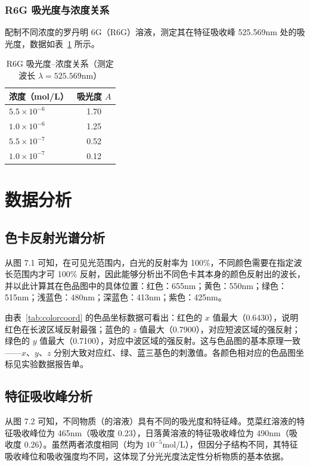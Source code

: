 \subsubsection{R6G 吸光度与浓度关系}

配制不同浓度的罗丹明 6G（R6G）溶液，测定其在特征吸收峰 525.569nm 处的吸光度，数据如表~\ref{tab:r6g} 所示。

\begin{table}[htbp]
    \centering
    \caption{R6G 吸光度--浓度关系（测定波长 $\lambda = 525.569$nm）}
    \label{tab:r6g}
    \begin{tabular}{lc}
        \toprule
        浓度（mol/L） & 吸光度 $A$ \\
        \midrule
        $5.5 \times 10^{-6}$ & 1.70 \\
        $1.0 \times 10^{-6}$ & 1.25 \\
        $5.5 \times 10^{-7}$ & 0.52 \\
        $1.0 \times 10^{-7}$ & 0.12 \\
        \bottomrule
    \end{tabular}
\end{table}

\section{数据分析}

\subsection{色卡反射光谱分析}

从图 7.1 可知，在可见光范围内，白光的反射率为 100\%，不同颜色需要在指定波长范围内才可 100\% 反射，因此能够分析出不同色卡其本身的颜色反射出的波长，并以此计算其在色品图中的具体位置：红色：655nm；黄色：550nm；绿色：515nm；浅蓝色：480nm；深蓝色：413nm；紫色：425nm。

由表~\ref{tab:colorcoord} 的色品坐标数据可看出：红色的 $x$ 值最大（0.6430），说明红色在长波区域反射最强；蓝色的 $z$ 值最大（0.7900），对应短波区域的强反射；绿色的 $y$ 值最大（0.7100），对应中波区域的强反射。这与色品图的基本原理一致——$x$、$y$、$z$ 分别大致对应红、绿、蓝三基色的刺激值。各颜色相对应的色品图坐标见实验数据报告单。

\subsection{特征吸收峰分析}

从图 7.2 可知，不同物质（的溶液）具有不同的吸光度和特征峰。苋菜红溶液的特征吸收峰位为 465nm（吸收度 0.23），日落黄溶液的特征吸收峰位为 490nm（吸收度 0.26）。虽然两者浓度相同（均为 $10^{-5}$mol/L），但因分子结构不同，其特征吸收峰位和吸收强度均不同，这体现了分光光度法定性分析物质的基本依据。

